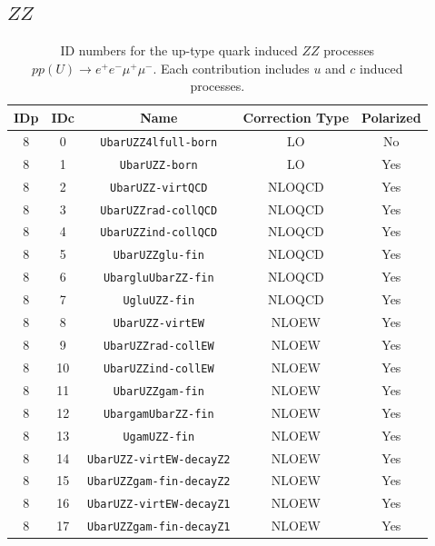 \documentclass[english,12pt]{article}
\begin{document}
\newpage
\subsection{$ZZ$}

\begin{table}[th!]
\begin{center}
\begin{tabular}{|c|c|c|c|c|}\hline
IDp & IDc & Name & Correction Type & Polarized \\
\hline
8 & 0 & {\tt UbarUZZ4lfull-born} & LO & No\\
8 & 1 & {\tt UbarUZZ-born} & LO & Yes\\
8 & 2 & {\tt UbarUZZ-virtQCD} & NLOQCD & Yes\\
8 & 3 & {\tt UbarUZZrad-collQCD} & NLOQCD & Yes\\
8 & 4 & {\tt UbarUZZind-collQCD} & NLOQCD & Yes\\
8 & 5 & {\tt UbarUZZglu-fin} & NLOQCD & Yes\\
8 & 6 & {\tt UbargluUbarZZ-fin} & NLOQCD & Yes\\
8 & 7 & {\tt UgluUZZ-fin} & NLOQCD & Yes\\
8 & 8 & {\tt UbarUZZ-virtEW} & NLOEW & Yes\\
8 & 9 & {\tt UbarUZZrad-collEW} & NLOEW & Yes\\
8 & 10 & {\tt UbarUZZind-collEW} & NLOEW & Yes\\
8 & 11 & {\tt UbarUZZgam-fin} & NLOEW & Yes\\
8 & 12 & {\tt UbargamUbarZZ-fin} & NLOEW & Yes\\
8 & 13 & {\tt UgamUZZ-fin} & NLOEW & Yes\\
8 & 14 & {\tt UbarUZZ-virtEW-decayZ2} & NLOEW & Yes\\
8 & 15 & {\tt UbarUZZgam-fin-decayZ2} & NLOEW & Yes\\
8 & 16 & {\tt UbarUZZ-virtEW-decayZ1} & NLOEW & Yes\\
8 & 17 & {\tt UbarUZZgam-fin-decayZ1} & NLOEW & Yes\\
\hline
\end{tabular}
\caption{\small ID numbers for the up-type quark induced $ZZ$ processes $pp(U) \to e^+e^-\mu^+\mu^-$. 
Each contribution includes $u$ and $c$ induced processes.}
\label{tab:IDs_proc_cont_ZZ_U}
\end{center}
\end{table}
\end{document}
